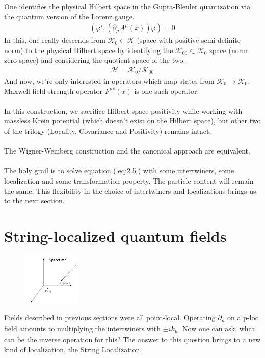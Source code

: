 \documentclass[12pt,a4paper]{article}
\numberwithin{equation}{section}
\begin{document}
One identifies the physical Hilbert space in the Gupta-Bleuler quantization via the quantum version of the Lorenz gauge. \begin{align*}
(\varphi',(\partial_\mu A^\mu(x))\varphi)=0
\end{align*}   
In this, one really descends from $\mathcal{K}_0\subset\mathcal{K}$ (space with positive semi-definite norm) to the physical Hilbert space by identifying the $\mathcal{K}_{00}\subset\mathcal{K}_0$ space (norm zero space) and considering the quotient space of the two. 
\begin{align}
\mathcal{H}=\mathcal{K}_0/\mathcal{K}_{00}
\end{align} 
And now, we're only interested in operators which map states from $\mathcal{K}_0\longrightarrow\mathcal{K}_0$. Maxwell field strength operator $F^{\mu\nu}(x)$ is one such operator. \\\\
In this construction, we sacrifice Hilbert space positivity  while working with massless Krein potential (which doesn't exist on the Hilbert space), but other two of the trilogy (Locality, Covariance and Positivity) remains intact.\\\\
The Wigner-Weinberg construction and the canonical approach are equivalent. \\\\
The holy grail is to solve equation (\ref{eq:2.5}) with some intertwiners, some localization and some transformation property. The particle content will remain the same. This flexibility in the choice of intertwiners and localizations brings us to the next section.  


\section{String-localized quantum fields}

\begin{figure}
    \centering
    \includegraphics[width=0.25\textwidth]{1}
\end{figure}
Fields described in previous sections were all point-local. Operating $\partial_\mu$ on a p-loc field amounts to multiplying the intertwiners with $\pm ik_\mu$. Now one can ask, what can be the inverse operation for this? The answer to this question brings to a new kind of localization, the String Localization.
\end{document}
